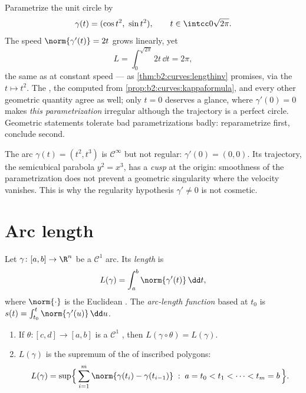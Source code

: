 \begin{example}\label{ex:b2:curves:speedinvariance}
Parametrize the unit circle by
\[
\gamma(t) = (\cos t^2,\ \sin t^2),
\qquad t \in \intcc0{\sqrt{2\pi}} .
\]
The speed $\norm{\gamma'(t)} = 2t$ grows linearly, yet
\[
L = \int_0^{\sqrt{2\pi}}2t\,\dd t = 2\pi ,
\]
the same  as at constant speed --- as
\cref{thm:b2:curves:lengthinv} promises, via the  $t \mapsto t^2$. The , the 
computed from \cref{prop:b2:curves:kappaformula}, and every
other geometric quantity agree as well; only $t = 0$
deserves a glance, where $\gamma'(0) = 0$ makes \emph{this
parametrization} irregular although the trajectory is a
perfect circle. Geometric statements tolerate bad
parametrizations badly: reparametrize first, conclude
second.
\end{example}

\begin{example}\label{ex:b2:curves:cusp}
The arc $\gamma(t) = (t^2, t^3)$ is $\mathcal{C}^\infty$ but not
regular: $\gamma'(0) = (0, 0)$. Its trajectory, the semicubical
parabola $y^2 = x^3$, has a \emph{cusp} at the origin: smoothness
of the parametrization does not prevent a geometric singularity
where the velocity vanishes. This is why the regularity hypothesis
$\gamma' \neq 0$ is not cosmetic.
\end{example}

\section{Arc length}

\begin{definition}\label{def:b2:curves:length}
Let $\gamma \colon [a, b] \to \R^n$ be a $\mathcal{C}^1$ arc. Its
\emph{length} is
\[
L(\gamma) = \int_a^b \norm{\gamma'(t)}\, \dd t ,
\]
where $\norm{\cdot}$ is the Euclidean . The \emph{arc-length
function} based at $t_0$ is $s(t) = \int_{t_0}^t
\norm{\gamma'(u)}\,\dd u$.
\end{definition}

\begin{theorem}\label{thm:b2:curves:lengthinv}
\leavevmode
\begin{enumerate}
\item If $\theta \colon [c, d] \to [a, b]$ is a $\mathcal{C}^1$
, then $L(\gamma \circ \theta) = L(\gamma)$.
\item $L(\gamma)$ is the supremum of the  of inscribed
polygons:
\[
L(\gamma)
= \sup\Bigl\{\, \sum_{i=1}^{m} \norm{\gamma(t_i) -
\gamma(t_{i-1})} \;:\; a = t_0 < t_1 < \dots < t_m = b \,\Bigr\}.
\]
\end{enumerate}
\end{theorem}

